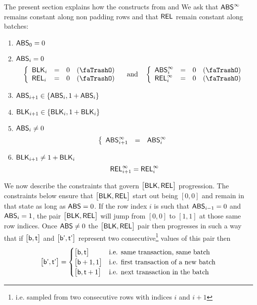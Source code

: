 The present section explains how the \zkEvm{} constructs
\locAbs  {} from
\block  {} and
\locRel     {}
We ask that $\textsf{ABS}^\infty$ remains constant along non padding rows and that $\textsf{REL}$ remain constant along batches:
\begin{enumerate}
	\item $\textsf{ABS}_{0} = 0$
	\item \If $\textsf{ABS}_{i} = 0$    \Then
		\[
			\left\{\begin{array}{lclr}
				\block      _{i} & = & 0 & (\trash) \\
				\locRel      _{i} & = & 0 & (\trash) \\
			\end{array} \right.
			\quad\text{and}\quad
			\left\{ \begin{array}{lclr}
				\locAbsMax   _{i} & = & 0 & (\trash) \\
				\locRelMax   _{i} & = & 0 & (\trash) \\
			\end{array}\right.
		\]
	\item $\textsf{ABS}_{i + 1} \in \{ \textsf{ABS}_{i}, 1 + \textsf{ABS}_{i} \}$
	\item $\textsf{BLK}_{i + 1}   \in \{ \textsf{BLK}_{i},   1 + \textsf{BLK}_{i}   \}$
	\item \If $\textsf{ABS}_{i} \neq 0$ \Then
		\[
			\left\{\begin{array}{lcl}
				\textsf{ABS}^\infty _{i + 1} & = & \textsf{ABS}^\infty _{i} \\
			\end{array}\right.
		\]
	\item   \If $\textsf{BLK}_{i + 1} \neq 1 + \textsf{BLK}_{i}$ \Then
		\[
			\textsf{REL}^\infty_{i + 1} = \textsf{REL}^\infty_{i}
		\]
\end{enumerate}
We now describe the constraints that govern $\big[\textsf{BLK}, \textsf{REL}\big]$ progression. The constraints below ensure that $\big[\textsf{BLK}, \textsf{REL}\big]$ start out being $[0,0]$ and remain in that state as long as $\textsf{ABS} = 0$. If the row index $i$ is such that $\textsf{ABS}_{i - 1} = 0$ and $\textsf{ABS}_{i} = 1$, the pair $\big[\textsf{BLK}, \textsf{REL}\big]$ will jump from $[0,0]$ to $[1,1]$ at those same row indices. Once $\textsf{ABS} \neq 0$ the $\big[\textsf{BLK}, \textsf{REL}\big]$ pair then progresses in such a way that if $\big[\textsf{b}, \textsf{t}\big]$ and $\big[\textsf{b'}, \textsf{t'}\big]$ represent two consecutive\footnote{i.e. sampled from two consecutive rows with indices $i$ and $i+1$} values of this pair then
\[
	\big[\textsf{b'}, \textsf{t'}\big]
	=
	\begin{cases}
		\big[\textsf{b}, \textsf{t} \big]     & \text{i.e. same transaction, same batch} \\
		\big[\textsf{b} + 1, 1 \big]       & \text{i.e. first transaction of a new batch} \\
		\big[\textsf{b}, \textsf{t} + 1 \big] & \text{i.e. next transaction in the batch} \\
	\end{cases}
\]
